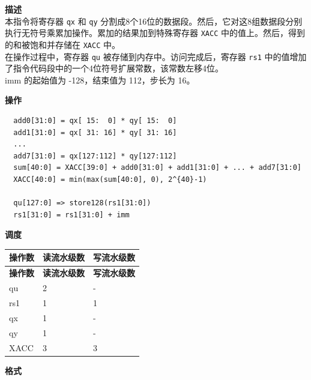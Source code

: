 \textbf{描述}\\
本指令将寄存器 \lstinline{qx} 和 \lstinline{qy} 分割成8个16位的数据段。然后，它对这8组数据段分别执行无符号乘累加操作。累加的结果加到特殊寄存器 \lstinline{XACC} 中的值上。然后，得到的和被饱和并存储在 \lstinline{XACC} 中。\\ 在操作过程中，寄存器 \lstinline{qu} 被存储到内存中。访问完成后，寄存器 \lstinline{rs1} 中的值增加了指令代码段中的一个4位符号扩展常数，该常数左移4位。\\

imm 的起始值为 -128，结束值为 112，步长为 16。

\textbf{操作}
\begin{lstlisting}
  add0[31:0] = qx[ 15:  0] * qy[ 15:  0]
  add1[31:0] = qx[ 31: 16] * qy[ 31: 16]
  ...
  add7[31:0] = qx[127:112] * qy[127:112]
  sum[40:0] = XACC[39:0] + add0[31:0] + add1[31:0] + ... + add7[31:0]
  XACC[40:0] = min(max(sum[40:0], 0), 2^{40}-1)

  qu[127:0] => store128(rs1[31:0])
  rs1[31:0] = rs1[31:0] + imm
\end{lstlisting}

\textbf{调度}\\
\begin{longtable}[c]{|l|l|l|}
    \hline
    \rowcolor{lightgray}
    \textbf{操作数} & \textbf{读流水级数} & \textbf{写流水级数} \\\hline
    \endfirsthead
    \hline
    \rowcolor{lightgray}
     \textbf{操作数} & \textbf{读流水级数} & \textbf{写流水级数} \\\hline
    \endhead
    \hline
    \endfoot

    qu & 2 & - \\\hline
    rs1 & 1 & 1 \\\hline
     qx & 1 & - \\\hline
     qy & 1 & - \\\hline
     XACC & 3 & 3

\end{longtable}

\textbf{格式}\\

